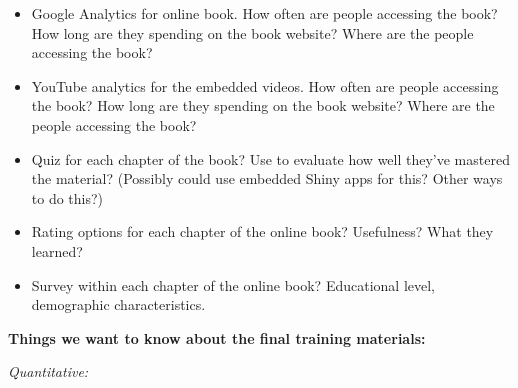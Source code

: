 \documentclass[pdftex,english,11pt,parskip=half]{scrartcl}
\begin{document}
\begin{itemize}
\item Google Analytics for online book. How often are people accessing the book? How long are they spending on the book website? Where are the people accessing the book?
\item YouTube analytics for the embedded videos. How often are people accessing the book? How long are they spending on the book website? Where are the people accessing the book?
\item Quiz for each chapter of the book? Use to evaluate how well they've mastered the material? (Possibly could use embedded Shiny apps for this? Other ways to do this?)
\item Rating options for each chapter of the online book? Usefulness? What they learned?
\item Survey within each chapter of the online book? Educational level, demographic characteristics.
\end{itemize}

\textbf{Things we want to know about the final training materials:}

\textit{Quantitative:}
\end{document}
